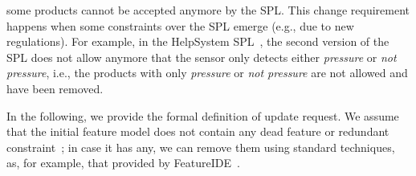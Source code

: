 \begin{tikzborder}{\cite{Gargantini16:validation}}
\begin{tikzborder}{\cite{gargantini_combinatorial_2017}}
\begin{tikzborder}{\cite{gargantini_combinatorial_2017}}
\begin{tikzborder}{\cite{garn2019}}
\begin{tikzborder}{\cite{arcaini2019achieving}}
\begin{compactitem}
		\item some products cannot be accepted anymore by the SPL. This change requirement happens when some constraints over the SPL emerge (e.g., due to new regulations). For example, in the {HelpSystem} SPL~\cite{helpSystemPaper}, the second version of the SPL does not allow anymore that the sensor only detects either {\it pressure} or {\it not pressure}, i.e., the products with only {\it pressure} or {\it not pressure} are not allowed and have been removed.
	\end{compactitem}
	
	In the following, we provide the formal definition of update request. We assume that the initial feature model does not contain any dead feature or redundant constraint~\cite{benavides2010automated,Duran2017FLAME}; in case it has any, we can remove them using standard techniques, as, for example, that provided by FeatureIDE~\cite{FeatureIDEbook}.
	

\end{tikzborder}
\end{tikzborder}
\end{tikzborder}
\end{tikzborder}
\end{tikzborder}
